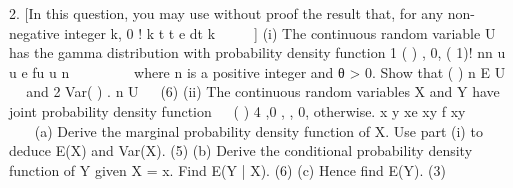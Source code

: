 2. [In this question, you may use without proof the result that, for any non-negative
integer k,
0
! k t t e dt k
    ]
(i) The continuous random variable U has the gamma distribution with probability
density function
1
( ) , 0, ( 1)!
nn u u e fu u
n
   
  
where n is a positive integer and θ > 0. Show that ( ) n E U
  and
2 Var( ) . n U
 
(6)
(ii) The continuous random variables X and Y have joint probability density
function
 
( ) 4 ,0 , , 0, otherwise.
x y xe xy f xy
      

(a) Derive the marginal probability density function of X. Use part (i) to
deduce E(X) and Var(X).
(5)
(b) Derive the conditional probability density function of Y given X = x.
Find E(Y | X).
(6)
(c) Hence find E(Y).
(3) 
